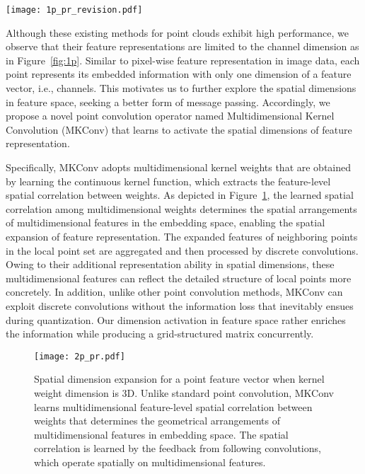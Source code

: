 \documentclass[preprint,12pt]{elsarticle}
\begin{document}
\begin{figure*}[t]
	\begin{center}
\texttt{[image: 1p\_pr\_revision.pdf]}
		
	\end{center}
	\vspace{-0.5cm}
	\caption{Overview of existing methods (left) and MKConv (right). MKConv can carry detailed geometric information via additional spatial arrangements of multidimensional local features, unlike other methods in which features have no spatial dimension.
	}
	
	\label{fig:1p}
\end{figure*}

Although these existing methods for point clouds exhibit high performance, we observe that their feature representations are limited to the channel dimension as in Figure~\ref{fig:1p}. Similar to pixel-wise feature representation in image data, each point represents its embedded information with only one dimension of a  feature vector, i.e., channels. This motivates us to further explore the spatial dimensions in feature space, seeking a better form of message passing. Accordingly, we propose a novel point convolution operator named Multidimensional Kernel Convolution (MKConv) that learns to activate the spatial dimensions of feature representation. 

Specifically, MKConv adopts multidimensional kernel weights that are obtained by learning the continuous kernel function, which extracts the feature-level spatial correlation between weights. As depicted in Figure~\ref{fig:2p}, the learned spatial correlation among multidimensional weights determines the spatial arrangements of multidimensional features in the embedding space, enabling the spatial expansion of feature representation. The expanded features of neighboring points in the local point set are aggregated and then processed by discrete convolutions. Owing to their additional representation ability in spatial dimensions, these multidimensional features can reflect the detailed structure of local points more concretely. In addition, unlike other point convolution methods, MKConv can exploit discrete convolutions without the information loss that inevitably ensues during quantization. Our dimension activation in feature space rather enriches the information while producing a grid-structured matrix concurrently.

\begin{figure}[t]
	\begin{center}
\texttt{[image: 2p\_pr.pdf]}
	\end{center}
	\vspace{-0.7cm}
	\caption{Spatial dimension expansion for a point feature vector when kernel weight dimension is 3D. Unlike standard point convolution, MKConv learns multidimensional feature-level spatial correlation between weights that determines the geometrical arrangements of multidimensional features in embedding space. The spatial correlation is learned by the feedback from following convolutions, which operate spatially on multidimensional features.
	}
	
	\label{fig:2p}
\end{figure}
\end{document}
